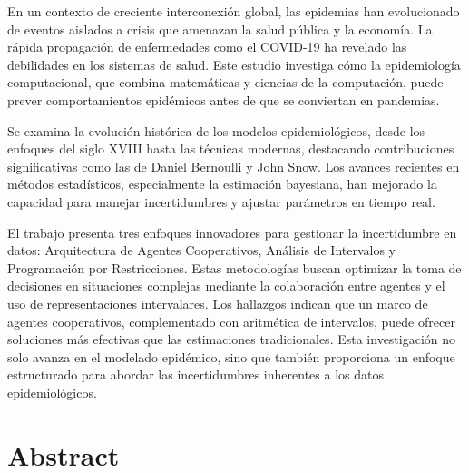 \documentclass{article}
\begin{document}
En un contexto de creciente interconexión global, las epidemias han evolucionado de eventos aislados a crisis que amenazan la salud pública y la economía. La rápida propagación de enfermedades como el COVID-19 ha revelado las debilidades en los sistemas de salud. Este estudio investiga cómo la epidemiología computacional, que combina matemáticas y ciencias de la computación, puede prever comportamientos epidémicos antes de que se conviertan en pandemias.

Se examina la evolución histórica de los modelos epidemiológicos, desde los enfoques del siglo XVIII hasta las técnicas modernas, destacando contribuciones significativas como las de Daniel Bernoulli y John Snow. Los avances recientes en métodos estadísticos, especialmente la estimación bayesiana, han mejorado la capacidad para manejar incertidumbres y ajustar parámetros en tiempo real.

El trabajo presenta tres enfoques innovadores para gestionar la incertidumbre en datos: Arquitectura de Agentes Cooperativos, Análisis de Intervalos y Programación por Restricciones. Estas metodologías buscan optimizar la toma de decisiones en situaciones complejas mediante la colaboración entre agentes y el uso de representaciones intervalares. Los hallazgos indican que un marco de agentes cooperativos, complementado con aritmética de intervalos, puede ofrecer soluciones más efectivas que las estimaciones tradicionales. Esta investigación no solo avanza en el modelado epidémico, sino que también proporciona un enfoque estructurado para abordar las incertidumbres inherentes a los datos epidemiológicos.

\newpage

\section*{ \textbf{ Abstract } }
\end{document}
